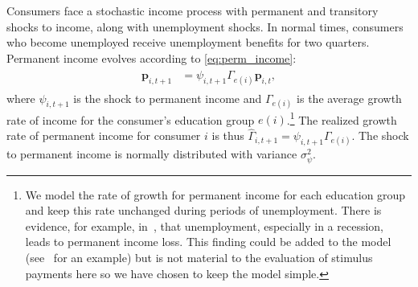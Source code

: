 \documentclass[qe,draft]{econsocart}
\theoremstyle{plain}
\theoremstyle{definition}
\begin{document}
Consumers face a stochastic income process with permanent and transitory shocks to income, along with unemployment shocks.
In normal times, consumers who become unemployed receive unemployment benefits for two quarters.
Permanent income evolves according to \eqref{eq:perm_income}:
\begin{equation}
  \begin{gathered}
    \begin{aligned}
      \mathbf{p}_{i,t+1} & = \psi_{i,t+1}\Gamma_{e(i)}\mathbf{p}_{i,t},
      \label{eq:perm_income} %
    \end{aligned}
  \end{gathered}
\end{equation}
where $\psi_{i,t+1}$ is the shock to permanent income and $\Gamma_{e(i)}$ is the average growth rate of income for the consumer's education group $e(i)$.\footnote{We model the rate of growth for permanent income for each education group and keep this rate unchanged during periods of unemployment.
  There is evidence, for example, in~\cite{davis-recessions-2011}, that unemployment, especially in a recession, leads to permanent income loss.
  This finding could be added to the model (see~\cite{carroll2020modeling} for an example) but is not material to the evaluation of stimulus payments here so we have chosen to keep the model simple.
} The realized growth rate of permanent income for consumer $i$ is thus $\hat{\Gamma}_{i,t+1} = \psi_{i,t+1} \Gamma_{e(i)}$.
The shock to permanent income is normally distributed with variance $\sigma_{\psi}^2$.
\end{document}
